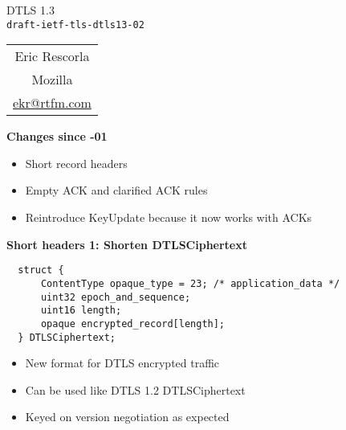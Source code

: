 \documentclass[helvetica]{seminar}
\newcommand{\heading}[1]{%
  \begin{center} 
    \large\bf 
    #1 
  \end{center} 
  \vspace{.4 in}}
\begin{document}
\centerslidestrue

\begin{slide}
\begin{center}
\vspace{.5 in}
\LARGE{{\bf}DTLS 1.3\\{\small \verb^draft-ietf-tls-dtls13-02^}}\\
\vspace{.2in}
\large{
\begin{tabular}{c}
Eric Rescorla\\
Mozilla\\
\url{ekr@rtfm.com}
\end{tabular}
}
\end{center}
\end{slide}

\centerslidesfalse 


\begin{slide}
  \heading{Changes since -01}

  \begin{itemize}
  \item Short record headers
  \item Empty ACK and clarified ACK rules
  \item Reintroduce KeyUpdate because it now works with ACKs
  \end{itemize}

\end{slide}

\begin{slide}
  \heading{Short headers 1: Shorten DTLSCiphertext}

\begin{verbatim}
  struct {
      ContentType opaque_type = 23; /* application_data */
      uint32 epoch_and_sequence;
      uint16 length;
      opaque encrypted_record[length];
  } DTLSCiphertext;
\end{verbatim}

  \begin{itemize}
  \item New format for DTLS encrypted traffic
  \item Can be used like DTLS 1.2 DTLSCiphertext
  \item Keyed on version negotiation as expected
  \end{itemize}
\end{slide}
\end{document}
